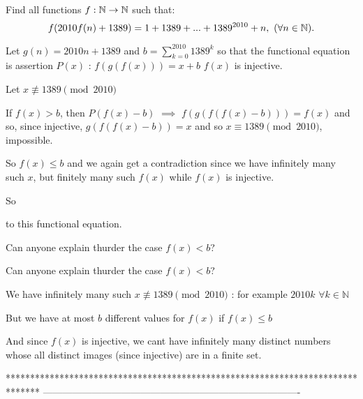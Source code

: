 \begin{solution}
	\begin{tcolorbox}Find all functions $f:\Bbb{N}\to \Bbb{N}$ such that:
\[f(2010f(n)+1389)=1+1389+...+1389^{2010}+n, \ (\forall n \in \Bbb{N}).\]\end{tcolorbox}
Let $g(n)=2010n+1389$ and $b=\sum_{k=0}^{2010}1389^k$ so that the functional equation is assertion $P(x)$ : $f(g(f(x)))=x+b$
$f(x)$ is injective.

Let $x\not\equiv 1389\pmod{2010}$

If $f(x)>b$, then $P(f(x)-b)$ $\implies$ $f(g(f(f(x)-b)))=f(x)$ and so, since injective, $g(f(f(x)-b))=x$ and so $x\equiv 1389\pmod{2010}$, impossible.

So $f(x)\le b$ and we again get a contradiction since we have infinitely many such $x$, but finitely many such $f(x)$ while $f(x)$ is injective.

So  to this functional equation.
\end{solution}



\begin{solution}
	Can anyone explain thurder the case $f(x)<b$?
\end{solution}



\begin{solution}
	\begin{tcolorbox}Can anyone explain thurder the case $f(x)<b$?\end{tcolorbox}
We have infinitely many such $x\not\equiv 1389\pmod{2010}$ : for example $2010k$ $\forall k\in\mathbb N$

But we have at most $b$ different values for $f(x)$ if $f(x)\le b$

And since $f(x)$ is injective, we cant have infinitely many distinct numbers whose all distinct images (since injective) are in a finite set.
\end{solution}
*******************************************************************************
-------------------------------------------------------------------------------

